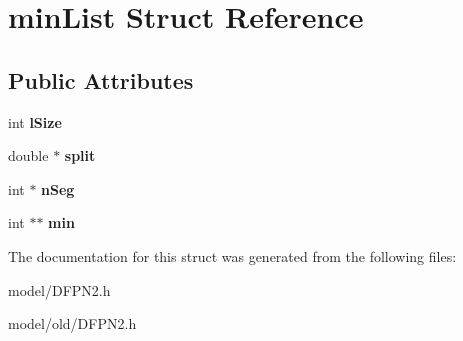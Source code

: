 \hypertarget{structminList}{\section{min\-List Struct Reference}
\label{structminList}
}
\subsection*{Public Attributes}
\begin{DoxyCompactItemize}
\item 
\hypertarget{structminList_a8d8c249dbdaa2533613bfbd3e41d33e4}{int {\bfseries l\-Size}}\label{structminList_a8d8c249dbdaa2533613bfbd3e41d33e4}

\item 
\hypertarget{structminList_aaca30147551ec44c7ed6c3b1d2cc9567}{double $\ast$ {\bfseries split}}\label{structminList_aaca30147551ec44c7ed6c3b1d2cc9567}

\item 
\hypertarget{structminList_a3ca02a4fb0f8dfe38d879b988f5ee245}{int $\ast$ {\bfseries n\-Seg}}\label{structminList_a3ca02a4fb0f8dfe38d879b988f5ee245}

\item 
\hypertarget{structminList_a5d9e4f125a1a2dbae89c5731fd819a91}{int $\ast$$\ast$ {\bfseries min}}\label{structminList_a5d9e4f125a1a2dbae89c5731fd819a91}

\end{DoxyCompactItemize}


The documentation for this struct was generated from the following files\-:\begin{DoxyCompactItemize}
\item 
model/D\-F\-P\-N2.\-h\item 
model/old/D\-F\-P\-N2.\-h\end{DoxyCompactItemize}
